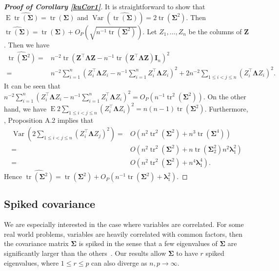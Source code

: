 \documentclass[12pt]{article} %
\DeclareMathOperator{\mytr}{tr}
\DeclareMathOperator{\myE}{E}
\DeclareMathOperator{\myVar}{Var}
\newcommand{\bZ}{\mathbf{Z}}
\newcommand{\bI}{\mathbf{I}}
\newcommand{\bfsym}[1]{\ensuremath{\boldsymbol{#1}}}
\def\blambda {\bfsym {\lambda}}
\def\bLambda {\bfsym {\Lambda}}
\def\bSigma {\bfsym {\Sigma}}
\theoremstyle{definition}
\begin{document}
\begin{proof}[\textbf{Proof of Corollary \ref{kuCor1}}]
It is straightforward to show that 
$\myE \widehat{\mytr(\bSigma)}=\mytr(\bSigma)$ and 
$\myVar \left(\widehat{\mytr(\bSigma)}\right)=2\mytr(\bSigma^2)$.
Then
$\widehat{\mytr(\bSigma)}=\mytr(\bSigma)+O_P(\sqrt{n^{-1}\mytr(\bSigma^2)})$.
Let $Z_1,\ldots, Z_n$ be the columns of $\bZ$.
Then we have
\begin{equation*}
    \begin{split}
\widehat{\mytr(\bSigma^2)}=&
n^{-2} \mytr(\bZ^\top \bLambda \bZ-n^{-1}\mytr(\bZ^\top \bLambda \bZ)\bI_n)^2
\\
=&
n^{-2} \sum_{i=1}^n (Z_{i}^\top \bLambda Z_i - n^{-1}\sum_{i=1}^n Z_{i}^\top \bLambda Z_i)^2
+
2n^{-2} \sum_{1\leq i < j \leq n} (Z_i^\top \bLambda Z_i)^2.
    \end{split}
\end{equation*}
It can be seen that
$
n^{-2} \sum_{i=1}^n (Z_{i}^\top \bLambda Z_i - n^{-1}\sum_{i=1}^n Z_{i}^\top \bLambda Z_i)^2
=O_P(n^{-1}\mytr^2(\bSigma^2))
$.
    On the other hand, we have $
\myE 2 \sum_{1\leq i < j \leq n} (Z_i^\top \bLambda Z_i)^2
=n(n-1)\mytr(\bSigma^2)
$.
    Furthermore, \cite{chen2010tests}, Proposition A.2 implies that
    \begin{equation*}
        \begin{split}
        \myVar\left(
            2\sum_{1\leq i<j\leq n} (Z_{i}^\top \bLambda Z_{j})^2
        \right)
        =& O\left(
            n^2 \mytr^2 (\bSigma^2) + n^3 \mytr(\bSigma^4)
        \right)
        \\
        =& O\left(
            n^2 \mytr^2 (\bSigma^2) + n \mytr(\bSigma_{2}^2) n^2 \blambda_{1}^2
        \right)
        \\
        =& O\left(
            n^2 \mytr^2 (\bSigma^2) + n^4 \blambda_{1}^4
        \right)
        .
        \end{split}
    \end{equation*}
    Hence
$
\widehat{\mytr(\bSigma^2)}=\mytr(\bSigma^2)+O_P(n^{-1}\mytr(\bSigma^2)+\blambda_1^2).
$
\end{proof}





\subsection{Spiked covariance}
We are especially interested in the case where variables are correlated.
For some real world problems, variables are heavily correlated with common factors, then the covariance matrix $\bSigma$ is spiked in the sense that a few eigenvalues of $\bSigma$ are significantly larger than the others~\citep{Fan2008High,Cai2012Sparse,Shen2013Consistency,Ma2015A}.
Our results allow $\bSigma$ to have $r$ spiked eigenvalues, where $1\leq r\leq p$ can also diverge as $n,p\to \infty$.
\end{document}
